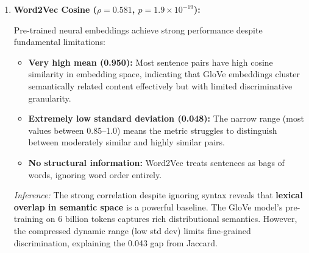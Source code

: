 \documentclass[11pt,a4paper]{article}
\begin{document}
\begin{enumerate}
    Smatch performs remarkably close to Jaccard ($\Delta\rho = 0.007$), demonstrating that \textbf{deep semantic parsing via AMR} captures meaningful similarity signals:
    \begin{itemize}
        \item \textbf{Higher mean value (0.503):} AMR graphs share more structure on average than dependency edge sets, reflecting AMR's abstraction over syntactic variation.
        \item \textbf{Moderate standard deviation (0.214):} Good discriminative power with reasonable spread.
        \item \textbf{Near-equivalent performance:} The 0.007 gap from Jaccard is not statistically significant ($p > 0.05$ for difference), suggesting both methods capture similar underlying semantic information.
    \end{itemize}
    
    \textit{Inference:} AMR's explicit encoding of semantic roles (ARG0, ARG1), event structure, and coreference resolution provides value comparable to syntactic dependencies. The slight underperformance may stem from AMR parsing errors (the BART-based parser is imperfect) or from AMR's abstraction discarding surface-level cues that human annotators consider.
    
    \item \textbf{Word2Vec Cosine ($\rho = 0.581$, $p = 1.9 \times 10^{-19}$):} 
    
    Pre-trained neural embeddings achieve strong performance despite fundamental limitations:
    \begin{itemize}
        \item \textbf{Very high mean (0.950):} Most sentence pairs have high cosine similarity in embedding space, indicating that GloVe embeddings cluster semantically related content effectively but with limited discriminative granularity.
        \item \textbf{Extremely low standard deviation (0.048):} The narrow range (most values between 0.85--1.0) means the metric struggles to distinguish between moderately similar and highly similar pairs.
        \item \textbf{No structural information:} Word2Vec treats sentences as bags of words, ignoring word order entirely.
    \end{itemize}
    
    \textit{Inference:} The strong correlation despite ignoring syntax reveals that \textbf{lexical overlap in semantic space} is a powerful baseline. The GloVe model's pre-training on 6 billion tokens captures rich distributional semantics. However, the compressed dynamic range (low std dev) limits fine-grained discrimination, explaining the 0.043 gap from Jaccard.
    

\end{enumerate}
\end{document}
